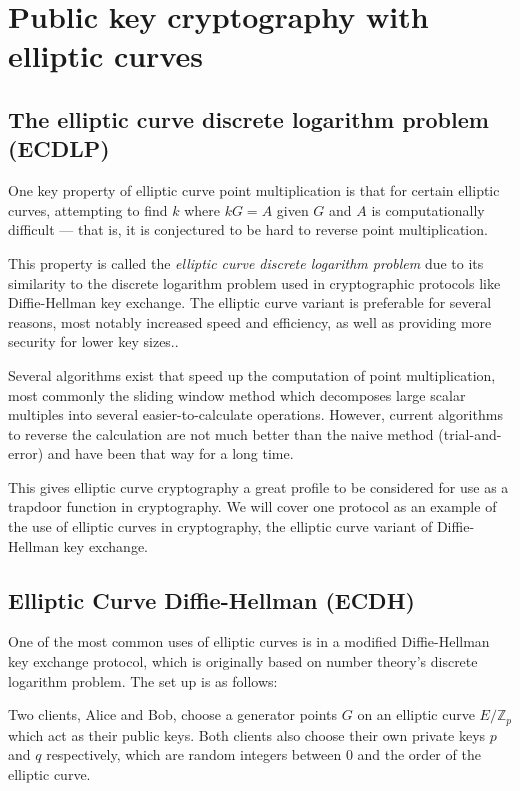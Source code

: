 \documentclass[a4paper]{article}
\begin{document}
\section{Public key cryptography with elliptic curves}

\subsection{The elliptic curve discrete logarithm problem (ECDLP)}\label{ecdlp}

One key property of elliptic curve point multiplication is that for certain elliptic curves, attempting to find $k$ where $kG = A$ given $G$ and $A$ is computationally difficult --- that is, it is conjectured to be hard to reverse point multiplication.\cite{practical}

This property is called the \textit{elliptic curve discrete logarithm problem} due to its similarity to the discrete logarithm problem used in cryptographic protocols like Diffie-Hellman key exchange.\cite{discrete} The elliptic curve variant is preferable for several reasons, most notably increased speed and efficiency,\cite{nist2} as well as providing more security for lower key sizes.\cite{nist}.

Several algorithms exist that speed up the computation of point multiplication, most commonly the sliding window method which decomposes large scalar multiples into several easier-to-calculate operations. However, current algorithms to reverse the calculation are not much better than the naive method (trial-and-error)\cite{guide} and have been that way for a long time. 

This gives elliptic curve cryptography a great profile to be considered for use as a trapdoor function in cryptography.\cite{nist} We will cover one protocol as an example of the use of elliptic curves in cryptography, the elliptic curve variant of Diffie-Hellman key exchange.

\subsection{Elliptic Curve Diffie-Hellman (ECDH)}

One of the most common uses of elliptic curves is in a modified Diffie-Hellman key exchange protocol, which is originally based on number theory's discrete logarithm problem. The set up is as follows:

Two clients, Alice and Bob, choose a generator points $G$ on an elliptic curve $E/\mathbb{Z}_p$ which act as their public keys. Both clients also choose their own private keys $p$ and $q$ respectively, which are random integers between $0$ and the order of the elliptic curve.
\end{document}
